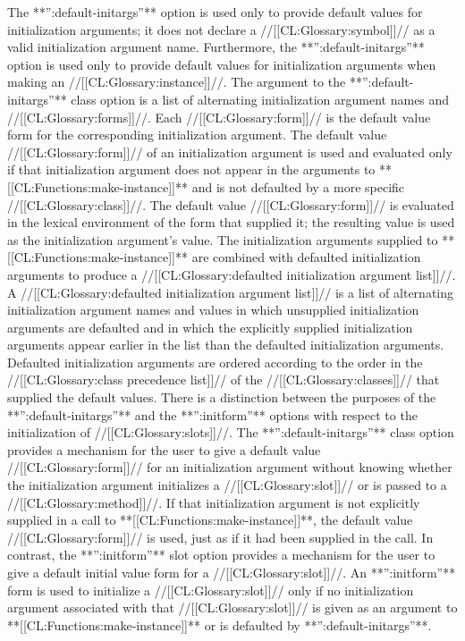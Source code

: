 The **'':default-initargs''** option is used only to provide default values for initialization arguments; it does not declare a //[[CL:Glossary:symbol]]//  as a valid initialization argument name.  Furthermore,  the **'':default-initargs''** option is used only to provide default values for initialization arguments when making an //[[CL:Glossary:instance]]//.
                      The argument to the **'':default-initargs''** class  option is a list of alternating initialization argument names and //[[CL:Glossary:forms]]//.   Each //[[CL:Glossary:form]]// is the default  value form for the corresponding initialization argument.  The default  value //[[CL:Glossary:form]]// of an initialization argument is used and evaluated only if that initialization argument does not appear in the arguments to **[[CL:Functions:make-instance]]** and is not defaulted by a more specific //[[CL:Glossary:class]]//.  The default  value //[[CL:Glossary:form]]// is evaluated in the lexical environment of the  form that supplied it; the resulting value is used as the initialization argument's value.
                                           The initialization arguments supplied to **[[CL:Functions:make-instance]]** are combined with defaulted initialization arguments to produce a  //[[CL:Glossary:defaulted initialization argument list]]//. A  //[[CL:Glossary:defaulted initialization argument list]]// is a list of alternating initialization argument names and values in which unsupplied initialization arguments are defaulted and in which the explicitly supplied initialization arguments appear earlier in the list than the defaulted initialization arguments.  Defaulted initialization arguments are ordered according to the order in the  //[[CL:Glossary:class precedence list]]// of the //[[CL:Glossary:classes]]// that supplied the default values.
                                                     There is a distinction between the purposes of the  **'':default-initargs''** and the **'':initform''** options with respect to the initialization of //[[CL:Glossary:slots]]//.  The **'':default-initargs''**  class option provides a mechanism for the user to give a default  value //[[CL:Glossary:form]]// for an initialization argument without knowing whether the initialization argument initializes a //[[CL:Glossary:slot]]//  or is passed to a //[[CL:Glossary:method]]//. If that initialization argument is not explicitly supplied in a call to **[[CL:Functions:make-instance]]**, the default  value //[[CL:Glossary:form]]// is used, just as if it had been supplied in the call.  In contrast, the  **'':initform''** slot option provides a mechanism for the user to give a default initial value form for a //[[CL:Glossary:slot]]//.  An **'':initform''** form is used to initialize a //[[CL:Glossary:slot]]// only if no initialization argument associated with that //[[CL:Glossary:slot]]// is given as an argument to  **[[CL:Functions:make-instance]]** or is defaulted by **'':default-initargs''**.

